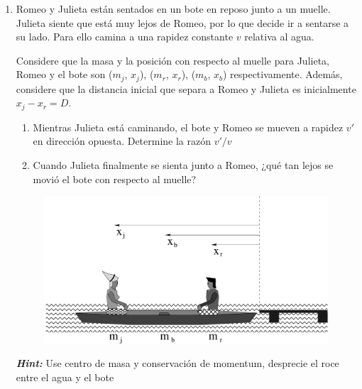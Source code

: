 \documentclass[letterpaper,11pt]{article}
\begin{document}
\begin{enumerate}
\item Romeo y Julieta están sentados en un bote en reposo junto a un muelle. Julieta siente que está muy lejos de Romeo, por lo que decide ir a sentarse a su lado. Para ello camina a una rapidez constante $v$ relativa al agua.

Considere que la masa y la posición con respecto al muelle para Julieta, Romeo y el bote son ($m_j$, $x_j$), ($m_r$, $x_r$), ($m_b$, $x_b$) respectivamente. Además, considere que la distancia inicial que separa a Romeo y Julieta es inicialmente $x_j-x_r=D$.

\begin{multicols}{2}
    \begin{enumerate}
        \item Mientras Julieta está caminando, el bote y Romeo se mueven a rapidez $v'$ en dirección opuesta. Determine la razón $v'/v$
        
        \item Cuando Julieta finalmente se sienta junto a Romeo, ¿qué tan lejos se movió el bote con respecto al muelle?
    \end{enumerate}
    
    \columnbreak
    
    \begin{figure}[H]
        \centering
        \includegraphics[width=0.7\linewidth]{2021-1/Imagenes/ejercicios/romeo-julieta.PNG}
    \end{figure}

\end{multicols}
\textbf{\textit{Hint:}} Use centro de masa y conservación de momentum, desprecie el roce entre el agua y el bote


%   

\end{enumerate}
\end{document}
